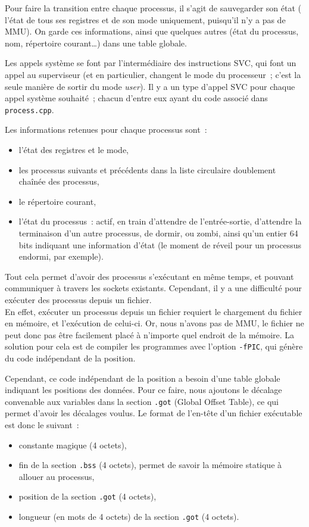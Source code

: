 \documentclass[11pt,a4paper]{article}
\newcommand{\fname}[1]{\texttt{#1}} %
\begin{document}
Pour faire la transition entre chaque processus, il s'agit de
sauvegarder son état (\ie{} l'état de tous ses registres et de son mode
uniquement, puisqu'il n'y a pas de MMU). On garde ces informations,
ainsi que quelques autres (état du processus, nom, répertoire
courant\ldots) dans une table globale.

Les appels système se font par l'intermédiaire des instructions SVC,
qui font un appel au superviseur (et en particulier, changent le mode
du processeur~; c'est la seule manière de sortir du mode
\textit{user}). Il y a un type d'appel SVC pour chaque appel système
souhaité~; chacun d'entre eux ayant du code associé dans
\fname{process.cpp}.

Les informations retenues pour chaque processus sont~:
\begin{itemize}
\item{l'état des registres et le mode,}
\item{les processus suivants et précédents dans la liste circulaire
  doublement chaînée des processus,}
\item{le répertoire courant,}
\item{l'état du processus~: actif, en train d'attendre de
  l'entrée-sortie, d'attendre la terminaison d'un autre processus,
  de dormir, ou zombi, ainsi qu'un entier 64 bits indiquant une
  information d'état (le moment de réveil pour un processus endormi,
  par exemple).}
\end{itemize}

Tout cela permet d'avoir des processus s'exécutant en même temps, et
pouvant communiquer à travers les sockets existants. Cependant, il
y a une difficulté pour exécuter des processus depuis un fichier.
\\

En effet, exécuter un processus depuis un fichier requiert le
chargement du fichier en mémoire, et l'exécution de celui-ci. Or, nous
n'avons pas de MMU, le fichier ne peut donc pas être facilement placé
à n'importe quel endroit de la mémoire. La solution pour cela est de
compiler les programmes avec l'option \texttt{-fPIC}, qui génère du
code indépendant de la position.

Cependant, ce code indépendant de la position a besoin d'une table
globale indiquant les positions des données. Pour ce faire, nous
ajoutons le décalage convenable aux variables dans la section
\texttt{.got} (Global Offset Table), ce qui permet d'avoir les
décalages voulus. Le format de l'en-tête d'un fichier exécutable est
donc le suivant~:
\begin{itemize}
\item{constante magique  (4 octets),} %
\item{fin de la section \texttt{.bss} (4 octets), permet de savoir la
  mémoire statique à allouer au processus,}
\item{position de la section \texttt{.got} (4 octets),}
\item{longueur (en mots de 4 octets) de la section \texttt{.got} (4 octets).\\}
\end{itemize}
\end{document}
